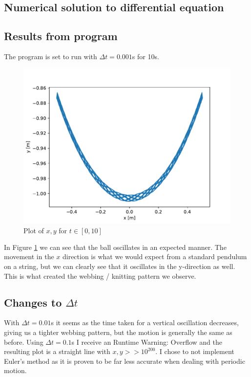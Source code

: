 \documentclass[a4paper,10pt,english]{article}
\begin{document}
\subsection{Numerical solution to differential equation}


\newpage
\subsection{Results from program}
The program is set to run with $\Delta t = 0.001$s for 10s. 
\begin{figure}[h!]
        \centering 
        \includegraphics[scale=.7]{mainplot.pdf} 
        \caption{Plot of $x, y$ for $t\in[0, 10]$}
        \label{xy}
\end{figure}

In Figure \ref{xy} we can see that the ball oscillates in an expected manner. The movement in the $x$ direction is what we would expect from a standard pendulum on a string, but we can clearly see that it oscillates in the y-direction as well. This is what created the webbing / knitting pattern we observe. 

\subsection{Changes to $\Delta t$}
With $\Delta t = 0.01$s it seems as the time taken for a vertical oscillation decreases, giving us a tighter webbing pattern, but the motion is generally the same as before. Using $\Delta t = 0.1$s I receive an Runtime Warning: Overflow and the resulting plot is a straight line with $x,y >> 10^{200}$. I chose to not implement Euler's method as it is proven to be far less accurate when dealing with periodic motion. 
\end{document}
